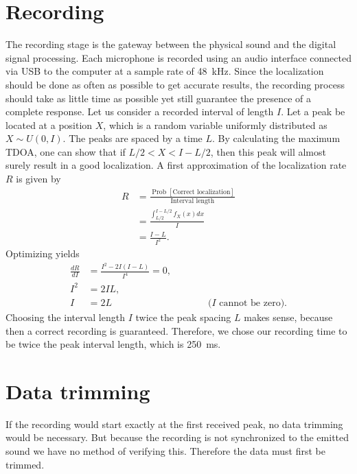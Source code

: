 \documentclass[11pt,titlepage]{report}
\begin{document}
\section{Recording}
\label{sec:loc_data_rec}
The recording stage is the gateway between the physical sound and the digital signal processing. Each microphone is recorded using an audio interface connected via USB to the computer at a sample rate of \SI{48}{\kilo\hertz}. Since the localization should be done as often as possible to get accurate results, the recording process should take as little time as possible yet still guarantee the presence of a complete response. Let us consider a recorded interval of length $I$. Let a peak be located at a position $X$, which is a random variable uniformly distributed as $X \sim U(0,I)$. The peaks are spaced by a time $L$. By calculating the maximum TDOA, one can show that if $L/2 < X < I-L/2$, then this peak will almost surely result in a good localization. A first approximation of the localization rate $R$ is given by
\begin{align*}
	R &= \frac{\operatorname{Prob}\left[\text{Correct localization}\right]}{\text{Interval length}} \\
	&= \frac{\int_{L/2}^{I-L/2}f_{X}(x)dx}{I} \\
	&= \frac{I-L}{I^2}.
\end{align*}
Optimizing yields
\begin{align*}
	\frac{dR}{dI} &= \frac{I^2-2I(I-L)}{I^4} = 0, \\
	I^2 &= 2IL, \\
	I &= 2L \hspace{10em} \text{($I$ cannot be zero)}.
\end{align*}
Choosing the interval length $I$ twice the peak spacing $L$ makes sense, because then a correct recording is guaranteed. Therefore, we chose our recording time to be twice the peak interval length, which is \SI{250}{ms}.


\section{Data trimming}
\label{sec:loc_data_trim}
If the recording would start exactly at the first received peak, no data trimming would be necessary. But because the recording is not synchronized to the emitted sound we have no method of verifying this. Therefore the data must first be trimmed.
\end{document}
